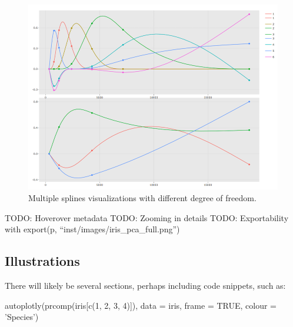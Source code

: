 \begin{figure}[htbp]
  \centering
  \includegraphics[width=145mm,scale=0.8]{images/splines_subplot.png}
  \caption{Multiple splines visualizations with different degree of freedom.}
  \label{figure:splines_subplot}
\end{figure}

TODO: Hoverover metadata TODO: Zooming in details TODO: Exportability
with export(p, ``inst/images/iris\_pca\_full.png'')

\subsection{Illustrations}\label{illustrations}

There will likely be several sections, perhaps including code snippets,
such as:

\begin{Schunk}
\begin{Sinput}
autoplotly(prcomp(iris[c(1, 2, 3, 4)]), data = iris, frame = TRUE, colour = 'Species')
\end{Sinput}
\end{Schunk}

